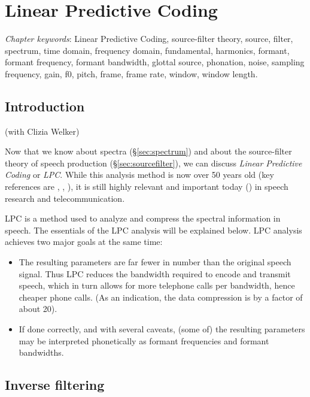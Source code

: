 \documentclass[
]{book}
\begin{document}
\chapter{Linear Predictive Coding}\label{ch-LPC}

\emph{Chapter keywords}: Linear Predictive Coding, source-filter theory, source, filter,
spectrum, time domain, frequency domain,
fundamental, harmonics, formant, formant frequency, formant bandwidth, glottal source, phonation, noise, sampling frequency, gain, f0, pitch, frame, frame rate, window, window length.

\section{Introduction}\label{introduction-1}

(with Clizia Welker)

Now that we know about spectra (§\ref{sec:spectrum}) and about the source-filter theory of speech production (§\ref{sec:sourcefilter}), we can discuss \emph{Linear Predictive Coding} or \emph{LPC}. While this analysis method is now over 50 years old (key references are \citet{Atal_Hanauer_1971}, \citet{Atal_Schroeder_1978}, \citet{Markel_Gray_1976}), it is still highly relevant and important today (\citet{Story_2026}) in speech research and telecommunication.

LPC is a method used to analyze and compress the spectral information in speech. The essentials of the LPC analysis will be explained below. LPC analysis achieves two major goals at the same time:

\begin{itemize}
\item
  The resulting parameters are far fewer in number than the original speech signal. Thus LPC reduces the bandwidth required to encode and transmit speech, which in turn allows for more telephone calls per bandwidth, hence cheaper phone calls. (As an indication, the data compression is by a factor of about 20).
\item
  If done correctly, and with several caveats, (some of) the resulting parameters may be interpreted phonetically as formant frequencies and formant bandwidths.
\end{itemize}

\section{Inverse filtering}\label{sec:inversefiltering}
\end{document}
